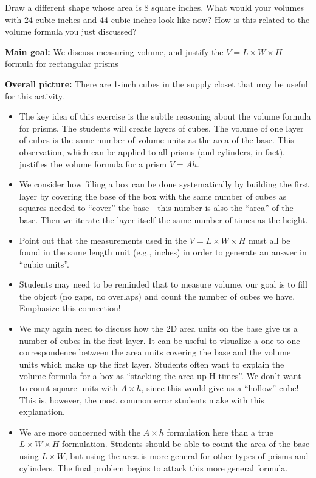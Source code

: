 \documentclass[nooutcomes,noauthor]{ximera}
\begin{document}
\begin{problem}
Draw a different shape whose area is $8$ square inches. What would your volumes with 24 cubic inches and 44 cubic inches look like now? How is this related to the volume formula you just discussed?
\end{problem}


\newpage
\begin{instructorNotes}

{\bf Main goal:} We discuss measuring volume, and justify the $V = L \times W \times H$ formula for rectangular prisms


{\bf Overall picture:} There are 1-inch cubes in the supply closet that may be useful for this activity.

\begin{itemize}
\item The key idea of this exercise is the subtle reasoning about the volume formula for prisms.  The students will create layers of cubes.  The volume of one layer of cubes is the same number of volume units as the area of the base.  This observation, which can be applied to all prisms (and cylinders, in fact), justifies the volume formula for a prism $V = Ah$.
\item We consider how filling a box can be done systematically by
  building the first layer by covering the base of the box with the
  same number of cubes as squares needed to ``cover'' the base - this
  number is also the ``area'' of the base.  Then we iterate the layer
  itself the same number of times as the height.
  \item Point out that the measurements used in the $V=L \times
  W \times H$ must all be found in the same length unit (e.g., inches)
  in order to generate an answer in ``cubic units''.
\item Students may need to be reminded that to measure volume, our goal is to fill the object (no gaps, no overlaps) and count the number of cubes we have. Emphasize this connection!
\item We may again need to discuss how the 2D area units on the base give us a number of cubes in the first layer. It can be useful to visualize a one-to-one correspondence between the area units covering the base and the volume units which make up the first layer. Students often want to explain the volume formula for a box as
  ``stacking the area up H times''. We don't want to count square units with $A \times h$, since this would give us a ``hollow'' cube! This is, however, the most common error students make with this explanation.
\item We are more concerned with the $A \times h$ formulation here than a true $L \times W \times H$ formulation. Students should be able to count the area of the base using $L \times W$, but using the area is more general for other types of prisms and cylinders. The final problem begins to attack this more general formula.
\end{itemize}


\end{instructorNotes}
\end{document}
